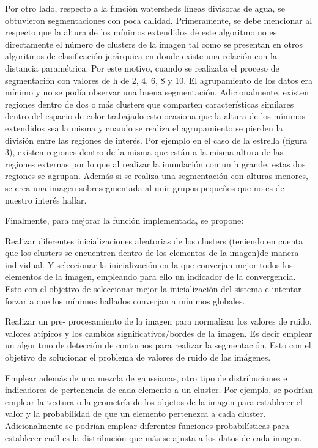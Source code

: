 \documentclass[10pt,twocolumn,letterpaper]{article}
\begin{document}
Por otro lado, respecto a la función watersheds líneas divisoras de agua, se obtuvieron segmentaciones con poca calidad. Primeramente, se debe mencionar al respecto que la altura de los mínimos extendidos de este algoritmo no es directamente el número de clusters de la imagen tal como se presentan en otros algoritmos de clasificación jerárquica en donde existe una relación con la distancia paramétrica. Por este motivo, cuando se realizaba el proceso de segmentación con valores de h de 2, 4, 6, 8 y 10. El agrupamiento de los datos era mínimo y no se podía observar una buena segmentación. Adicionalmente, existen regiones dentro de dos o más clusters que comparten características similares dentro del espacio de color trabajado esto ocasiona que la altura de los mínimos extendidos sea la misma y cuando se realiza el agrupamiento se pierden la división entre las regiones de interés. Por ejemplo en el caso de la estrella (figura 3), existen regiones dentro de la misma que están a la misma altura de las regiones externas por lo que al realizar la inundación con un h grande, estas dos regiones se agrupan. Además si se realiza una segmentación con alturas menores, se crea una imagen sobresegmentada al unir grupos pequeños que no es de nuestro interés hallar.

Finalmente, para mejorar la función implementada, se propone:

Realizar diferentes inicializaciones aleatorias de los clusters (teniendo en cuenta que los clusters se encuentren dentro de los elementos de la imagen)de manera individual. Y seleccionar la inicialización en la que converjan mejor todos los elementos de la imagen, empleando para ello un indicador de la convergencia. Esto con el objetivo de seleccionar mejor la inicialización del sistema e intentar forzar a que los mínimos hallados converjan a mínimos globales. 

Realizar un pre- procesamiento de la imagen para normalizar los valores de ruido, valores atípicos y los cambios significativos/bordes de la imagen. Es decir emplear un algoritmo de detección de contornos para realizar la segmentación. Esto con el objetivo de solucionar el problema de valores de ruido de las imágenes.

Emplear además de una mezcla de gaussianas, otro tipo de distribuciones e indicadores de pertenencia de cada elemento a un cluster. Por ejemplo, se podrían emplear la textura o la geometría de los objetos de la imagen para establecer el valor y la probabilidad de que un elemento pertenezca a cada cluster. Adicionalmente se podrían emplear diferentes funciones probabilísticas para establecer cuál es la distribución que más se ajusta a los datos de cada imagen.
\end{document}
